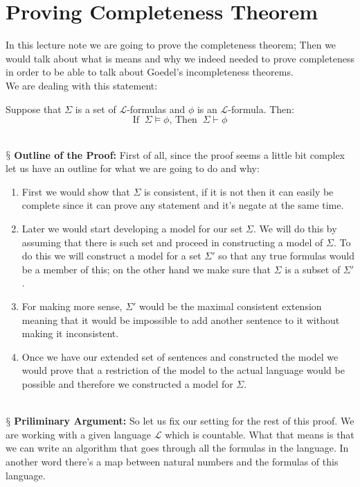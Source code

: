 \documentclass[9pt,a4paper]{article}
\newcounter{theo}
\newcommand{\newpoint}[1]{\ \\ \indent$\mathsection$ \textbf{#1}}
\newcommand{\curveL}{\mathcal{L}}
\begin{document}
    \section{Proving Completeness Theorem} 
        In this lecture note we are going to prove the completeness theorem; Then we would talk about what is means and why we indeed needed to prove completeness in order to be able to talk about Goedel's incompleteness theorems.
        \\
        We are dealing with this statement:
        \begin{center}
            Suppose that $\Sigma$ is a set of $\curveL$-formulas and $\phi$ is an $\curveL$-formula. Then:
            \begin{equation}
                \text{If } \ \Sigma\vDash\phi \text{, Then } \ \Sigma \vdash \phi
            \end{equation}
        \end{center}
        \newpoint{Outline of the Proof:} First of all, since the proof seems a little bit complex let us have an outline for what we are going to do and why:
        \begin{enumerate}
            \item First we would show that $\Sigma$ is consistent, if it is not then it can easily be complete since it can prove any statement and it's negate at the same time.
            \item Later we would start developing a model for our set $\Sigma$. We will do this by assuming that there is such set and proceed in constructing a model of $\Sigma$. To do this we will construct a model for a set $\Sigma'$ so that any true formulas would be a member of this; on the other hand we make sure that $\Sigma$ is a subset of $\Sigma'$.
            \item For making more sense, $\Sigma'$ would be the maximal consistent extension meaning that it would be impossible to add another sentence to it without making it inconsistent.
            \item Once we have our extended set of sentences and constructed the model we would prove that a restriction of the model to the actual language would be possible and therefore we constructed a model for $\Sigma$.
        \end{enumerate}
        \newpoint{Priliminary Argument: } So let us fix our setting for the rest of this proof. We are working with a given language $\curveL$ which is countable. What that means is that we can write an algorithm that goes through all the formulas in the language. In another word there's a map between natural numbers and the formulas of this language.
\end{document}
